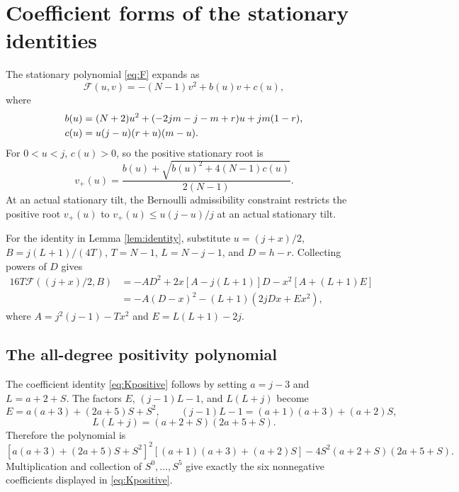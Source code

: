 \documentclass[11pt,a4paper]{article}
\begin{document}


\section{Coefficient forms of the stationary identities}\label{app:algebra}
The stationary polynomial \eqref{eq:F} expands as
\begin{equation}\label{eq:explicitF}
 \mathcal F(u,v)=-(N-1)v^2+b(u)v+c(u),
\end{equation}
where
\begin{align}\label{eq:bc}
 b(u)&=(N+2)u^2+(-2jm-j-m+r)u+jm(1-r),\\
 c(u)&=u(j-u)(r+u)(m-u).\notag
\end{align}
For $0<u<j$, $c(u)>0$, so the positive stationary root is
\begin{equation}\label{eq:vplus}
 v_+(u)=\frac{b(u)+\sqrt{b(u)^2+4(N-1)c(u)}}{2(N-1)}.
\end{equation}
At an actual stationary tilt, the Bernoulli admissibility constraint restricts the positive root $v_+(u)$ to $v_+(u)\le u(j-u)/j$ at an actual stationary tilt.

For the identity in Lemma \ref{lem:identity}, substitute $u=(j+x)/2$, $B=j(L+1)/(4T)$, $T=N-1$, $L=N-j-1$, and $D=h-r$. Collecting powers of $D$ gives
\begin{align*}
 16T\mathcal F((j+x)/2,B)
 &=-AD^2+2x[A-j(L+1)]D-x^2[A+(L+1)E]\\
 &=-A(D-x)^2-(L+1)(2jDx+Ex^2),
\end{align*}
where $A=j^2(j-1)-Tx^2$ and $E=L(L+1)-2j$.

\subsection{The all-degree positivity polynomial}\label{app:poly}
The coefficient identity \eqref{eq:Kpositive} follows by setting $a=j-3$ and $L=a+2+S$. The factors $E$, $(j-1)L-1$, and $L(L+j)$ become
\[
 E=a(a+3)+(2a+5)S+S^2,\qquad
 (j-1)L-1=(a+1)(a+3)+(a+2)S,
\]
\[
 L(L+j)=(a+2+S)(2a+5+S).
\]
Therefore the polynomial is
\[
 [a(a+3)+(2a+5)S+S^2]^2[(a+1)(a+3)+(a+2)S]
 -4S^2(a+2+S)(2a+5+S).
\]
Multiplication and collection of $S^0,\ldots,S^5$ give exactly the six nonnegative coefficients displayed in \eqref{eq:Kpositive}.

\end{document}
